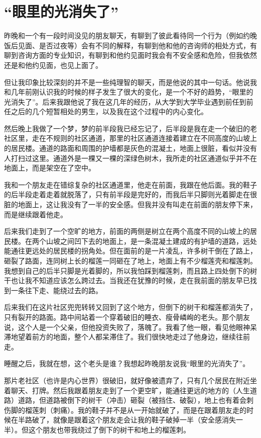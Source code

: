 \chapter{“眼里的光消失了”}




昨晚和一个有一段时间没见的朋友聊天，有聊到了彼此看待同一个行为（例如约晚饭后见面、是否过夜等）会有不同的解释，有聊到他和他的咨询师的相处方式，有聊到咨询方面的专业知识，有聊到和他约见面时我会有不安全感和危险，但我依然还是和他约见面，也见上面了。

但让我印象比较深刻的并不是一些纯理智的聊天，而是他说的其中一句话。他说我和几年前刚认识我的时候的样子发生了很大的变化，是一个不好的趋势，“眼里的光消失了”。后来我跟他说了我在这几年的经历，从大学到大学毕业遇到前任到前任之后的几个短暂相处的男生，以及我在这个过程中的内心变化。

然后晚上我做了一个梦，梦的前半段我已经忘记了，后半段是我在走一个破旧的老社区里，走在不规则的社区通道，那里的社区通道连接着建立在不同高度的山坡上的居民楼。通道的路面和周围的护墙都是灰色的混凝土，地面上很脏，看似并没有人打扫过这里。通道外是一棵又一棵的深绿色树木，我所走的社区通道似乎并不在地面上，而是架空在了空中。

我和一个朋友走在错综复杂的社区通道里，他走在前面，我跟在他后面。我的鞋子的后半段走着走着就脱落了，只有前半段是完好的，而我后半只脚则光着脚走在很脏的地面上，这让我没有了一半的安全感。但我并没有叫走在前面的朋友停下来，而是继续跟着他走。

后来我们走到了一个空旷的地方，前面的两侧是树立在两个高度不同的山坡上的居民楼。在两个山坡之间凹下去的地面上，是一条混凝土建成的有护墙的道路，远处能通往更远处的居民楼的拐角处。但在面前的是一片凌乱，许多树干倒在了路上，砸裂了路面，连同树上长的榴莲一同砸在了地上，地面上有不少榴莲壳和榴莲刺。我想到自己的后半只脚是光着脚的，所以我怕踩到榴莲刺，而且路上四处倒下的树干也让我不知道应该怎么跨过去。当我还在犹豫的时候，走在我前面的朋友早已找到一条往下走、能绕过去的路。

后来我们在这片社区兜兜转转又回到了这个地方，但倒下的树干和榴莲都消失了，只有裂开的路面。路中间站着一个穿着破旧的睡衣、瘦骨嶙峋的老头。那个朋友说，这个人是一个父亲，但他投资失败了，落魄了。我看了他一眼，看见他眼神呆滞地望着前方的地面，整个人都呆滞住了。我们很快地走过了他身边，继续往前走。

睡醒之后，我就在想，这个老头是谁？我想起昨晚朋友说我“眼里的光消失了”。

那片老社区（也许是内心世界）很破旧，就好像被遗弃了，只有几个居民在附近坐着聊天、打牌。然后我跟着朋友走到了一个更空旷，能通往更远的地方的（人生道路）道路，但道路被倒下的树干（冲击）砸裂（被挡住、破裂），地上也有着会刺伤脚的榴莲刺（刺痛）。我的鞋子并不是从一开始就破了，而是在跟着朋友走的时候在半路破了，就像是跟着这个朋友走会让我的鞋子破掉一半（安全感消失一半）。但这个朋友也带我绕过了倒下的树干和地上的榴莲刺。

